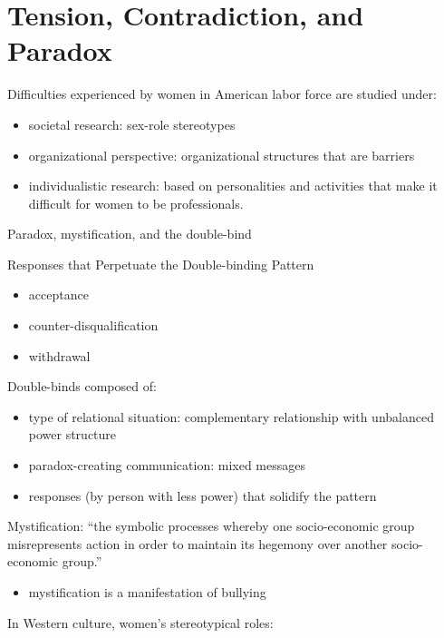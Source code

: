 \documentclass[
]{book}
\providecommand{\tightlist}{%
  \setlength{\itemsep}{0pt}\setlength{\parskip}{0pt}}
\begin{document}
\hypertarget{tension-contradiction-and-paradox}{%
\chapter{Tension, Contradiction, and Paradox}\label{tension-contradiction-and-paradox}}

\citep{Wood_1983}

Difficulties experienced by women in American labor force are studied under:

\begin{itemize}
\item
  societal research: sex-role stereotypes
\item
  organizational perspective: organizational structures that are barriers
\item
  individualistic research: based on personalities and activities that make it difficult for women to be professionals.
\end{itemize}

Paradox, mystification, and the double-bind

Responses that Perpetuate the Double-binding Pattern

\begin{itemize}
\item
  acceptance
\item
  counter-disqualification
\item
  withdrawal
\end{itemize}

Double-binds composed of:

\begin{itemize}
\item
  type of relational situation: complementary relationship with unbalanced power structure
\item
  paradox-creating communication: mixed messages
\item
  responses (by person with less power) that solidify the pattern
\end{itemize}

Mystification: ``the symbolic processes whereby one socio-economic group misrepresents action in order to maintain its hegemony over another socio-economic group.''

\begin{itemize}
\tightlist
\item
  mystification is a manifestation of bullying
\end{itemize}

In Western culture, women's stereotypical roles:
\end{document}
